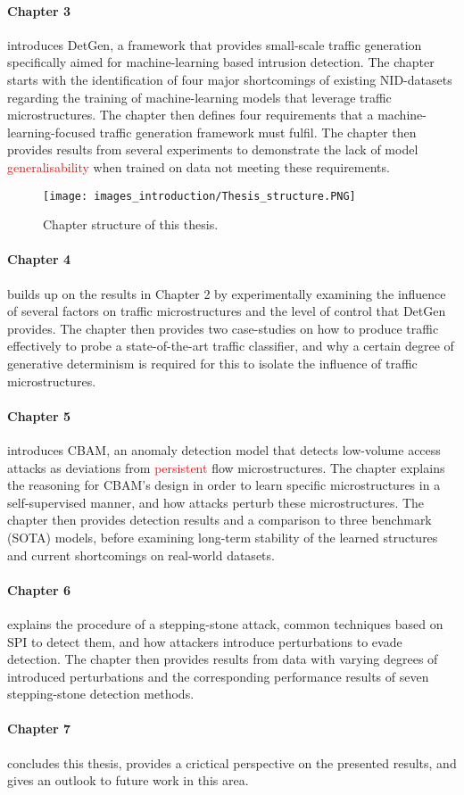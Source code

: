\paragraph{Chapter 3} introduces DetGen, a framework that provides small-scale traffic generation specifically aimed for machine-learning based intrusion detection. The chapter starts with the identification of four major shortcomings of existing NID-datasets regarding the training of machine-learning models that leverage traffic microstructures. The chapter then defines four requirements that a machine-learning-focused traffic generation framework must fulfil. The chapter then provides results from several experiments to demonstrate the lack of model \textcolor{red}{generalisability} when trained on data not meeting these requirements. 

\begin{figure}[t]
\centering
\texttt{[image: images\_introduction/Thesis\_structure.PNG]}
\caption{Chapter structure of this thesis.}\label{Fig:structure}
\end{figure}

\paragraph{Chapter 4} builds up on the results in Chapter 2 by experimentally examining the influence of several factors on traffic microstructures and the level of control that DetGen provides. The chapter then provides two case-studies on how to produce traffic effectively to probe a state-of-the-art traffic classifier, and why a certain degree of generative determinism is required for this to isolate the influence of traffic microstructures. 

\paragraph{Chapter 5} introduces CBAM, an anomaly detection model that detects low-volume access attacks as deviations from \textcolor{red}{persistent} flow microstructures. The chapter explains the reasoning for CBAM's design in order to learn specific microstructures in a self-supervised manner, and how attacks perturb these microstructures. The chapter then provides detection results and a comparison to three benchmark (SOTA) models, before examining long-term stability of the learned structures and current shortcomings on real-world datasets.

\paragraph{Chapter 6} explains the procedure of a stepping-stone attack, common techniques based on SPI to detect them, and how attackers introduce perturbations to evade detection. The chapter then provides  results from data with varying degrees of introduced perturbations and the corresponding performance results of seven stepping-stone detection methods.

\paragraph{Chapter 7} concludes this thesis, provides a crictical perspective on the presented results, and gives an outlook to future work in this area.